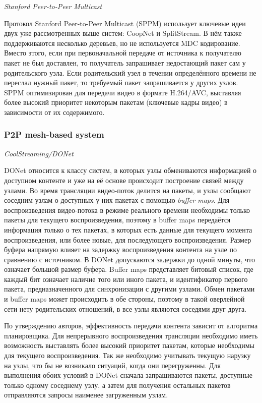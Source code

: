 		\textit{Stanford Peer-to-Peer Multicast}

		Протокол Stanford Peer-to-Peer Multicast (SPPM) использует ключевые идеи двух уже рассмотренных выше систем:
		CoopNet и SplitStream. В нём также поддерживаются несколько деревьев, но не используется MDC кодирование.
		Вместо этого, если при первоначальной передаче от источника к получателю пакет не был доставлен, то получатель
		запрашивает недостающий пакет сам у родительского узла. Если родительский узел в течении определённого времени
		не переслал нужный пакет, то требуемый пакет запрашивается у других узлов. SPPM оптимизирован для передачи
		видео в формате H.264/AVC, выставляя более высокий приоритет некоторым пакетам (ключевые кадры видео) в
		зависимости от их содержимого.

		\subsubsection{P2P mesh-based system}

		\textit{CoolStreaming/DONet}

		DONet относится к классу систем, в которых узлы обмениваются информацией о доступном контенте и уже на её основе
		происходит построение связей между узлами. Во время трансляции видео-поток делится на пакеты, и узлы сообщают
		соседним узлам о доступных у них пакетах с помощью \textit{buffer maps}. Для воспроизведения видео-потока в
		режиме реального времени необходимы только пакеты для текущего воспроизведения, поэтому в buffer maps передаётся
		информация только о тех пакетах, в которых есть данные для текущего момента воспроизведения, или более новые,
		для последующего воспроизведения. Размер буфера напрямую влияет на задержку воспроизведения контента на узле по
		сравнению с источником. В DONet допускаются задержки до одной минуты, что означает большой размер буфера.
		Buffer maps представляет битовый список, где каждый бит означает наличие того или иного пакета, и идентификатор
		первого пакета, предназначенного для синхронизации с другими узлами. Обмен пакетами и buffer maps может
		происходить в обе стороны, поэтому в такой оверлейной сети нету родительских отношений, в все узлы являются
		соседями друг друга.

		По утверждению авторов, эффективность передачи контента зависит от алгоритма планировщика. Для непрерывного
		воспроизведения трансляции необходимо иметь возможность выставлять более высокий приоритет пакетам, которые
		необходимы для текущего воспроизведения. Так же необходимо учитывать текущую нарузку на узлы, что бы не
		возникало ситуаций, когда они перегруженны. Для выполнения обоих условий в DONet сначала запрашиваются пакеты,
		доступные только одному соседнему узлу, а затем для получения остальных пакетов отправляются запросы наименее
		загруженным узлам.

